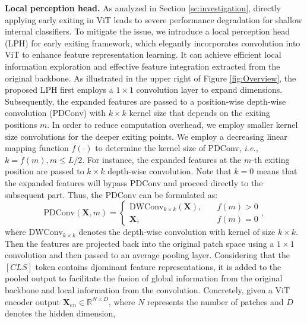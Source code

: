 \textbf{Local perception head.} 
As analyzed in Section \ref{sc:investigation}, directly applying early exiting in ViT leads to severe performance degradation for shallow internal classifiers. 
To mitigate the issue, we introduce a local perception head (LPH) for early exiting framework, which elegantly incorporates convolution into ViT to enhance feature representation learning. 
It can achieve efficient local information exploration and effective feature integration extracted from the original backbone.   
As illustrated in the upper right of Figure \ref{fig:Overview}, 
the proposed LPH first employs a $1\times 1$ convolution layer to expand dimensions. 
Subsequently, the expanded features are passed to a position-wise depth-wise convolution (PDConv) with $k\times k$ kernel size that depends on the exiting positions $m$.
In order to reduce computation overhead, we employ smaller kernel size convolutions for the deeper exiting points. 
We employ a decreasing linear mapping function $f(\cdot)$ to determine the kernel size of PDConv, \textit{i.e.}, $k=f(m), m\leq L/2$. 
For instance, the expanded features at the $m$-th exiting position are passed to $k\times k$ depth-wise convolution. 
Note that $k=0$ means that the expanded features will bypass PDConv and proceed directly to the subsequent part. 
Thus, the PDConv can be formulated as: 
\begin{equation}
  \text{PDConv}(\mathbf{X}, m)=\begin{cases}
    \text{DWConv}_{k\times k}(\mathbf{X}), \quad & f(m) > 0 \\
    \mathbf{X}, \quad & f(m) = 0
  \end{cases},
\end{equation}
where $\text{DWConv}_{k\times k}$ denotes the depth-wise convolution with kernel of size $k\times k$. 
Then the features are projected back into the original patch space using a $1\times 1$ convolution and then passed to an average pooling layer. 
Considering that the $[CLS]$ token contains djominant feature representations, 
it is added to the pooled output to facilitate the fusion of global information from the original backbone and local information from the convolution.
Concretely, 
given a ViT encoder output $\mathbf{X}_{en} \in \mathbb{R}^{N\times D} $, 
where $N$ represents the number of patches and $D$ denotes the hidden dimension, 
